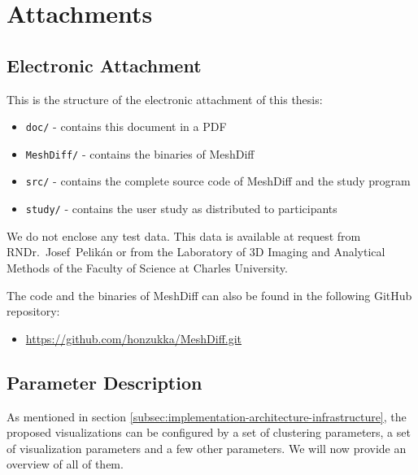 \chapter{Attachments}

\section{Electronic Attachment}
\label{attch:electronic}

This is the structure of the electronic attachment of this thesis:

\begin{itemize}
	\item \verb+doc/+ - contains this document in a PDF
	\item \verb+MeshDiff/+ - contains the binaries of MeshDiff
	\item \verb+src/+ - contains the complete source code of MeshDiff and the study program
	\item \verb+study/+ - contains the user study as distributed to participants
\end{itemize}

We do not enclose any test data. This data is available at request from RNDr.~Josef~Pelikán or from the Laboratory of 3D Imaging and Analytical Methods of the Faculty of Science at Charles University.

The code and the binaries of MeshDiff can also be found in the following GitHub repository: 
\begin{itemize}
	\item \url{https://github.com/honzukka/MeshDiff.git}
\end{itemize}

\clearpage

\section{Parameter Description}
\label{attch:parameter_description}

As mentioned in section \ref{subsec:implementation-architecture-infrastructure}, the proposed visualizations can be configured by a set of clustering parameters, a set of visualization parameters and a few other parameters. We will now provide an overview of all of them.

